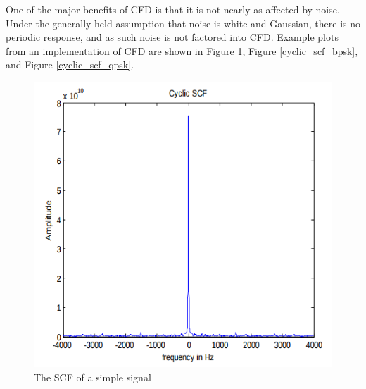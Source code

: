 One of the major benefits of CFD is that it is not nearly as affected by noise. Under the generally held assumption that noise is white and Gaussian, there is no periodic response, and as such noise is not factored into CFD. Example plots from an implementation of CFD are shown in Figure \ref{fig:cyclic_scf}, Figure \ref{cyclic_scf_bpsk}, and Figure \ref{cyclic_scf_qpsk}. \par
\begin{figure}[ht!]
\centering
  \includegraphics[scale=0.4]{img/cyclic_scf.png}
\caption{The SCF of a simple signal}
\label{fig:cyclic_scf}

\end{figure}
